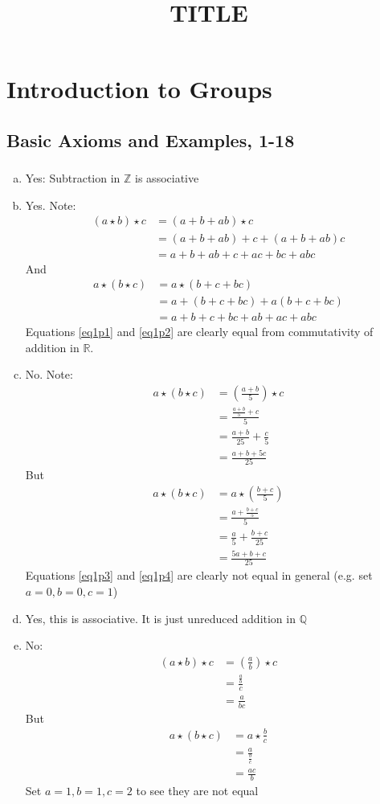 \documentclass{article}
\title{TITLE}
\newcommand{\ints}{\mathbb{Z}}
\newcommand{\reals}{\mathbb{R}}
\newcommand{\rats}{\mathbb{Q}}
\newcommand{\mult}{\star}
\begin{document}
\vspace{-5em}

\section{Introduction to Groups}
\subsection{Basic Axioms and Examples, 1-18}
\subsubsection{}
\begin{enumerate}[(a)]
\item Yes: Subtraction in $\ints$ is associative
\item Yes. Note:
\begin{align}
(a \mult b) \mult c &= (a+b+ab)\mult c\\
&= (a+b+ab) + c + (a+b+ab)c\\
&= a+b+ab+c+ac+bc+abc \label{eq1p1}
\end{align}
And
\begin{align}
a \mult (b \mult c) &= a\mult (b+c+bc)\\
&= a + (b+c+bc) + a(b+c+bc)\\
&= a+b+c+bc+ab+ac+abc \label{eq1p2}
\end{align}
Equations \eqref{eq1p1} and \eqref{eq1p2} are clearly equal from commutativity of addition in $\reals$.
\item No. Note:
\begin{align}
	a\mult(b\mult c) &= (\frac{a+b}{5})\mult c\\
&= \frac{ \frac{a+b}{5} + c}{5}\\
&= \frac{a+b}{25} + \frac{c}{5}\\
&= \frac{a+b+5c}{25} \label{eq1p3}
\end{align}
But
\begin{align}
	a\mult(b\mult c) &= a\mult (\frac{b+c}{5})\\
&= \frac{a+\frac{b+c}{5}}{5}\\
&= \frac{a}{5} + \frac{b+c}{25}\\
&= \frac{5a+b+c}{25} \label{eq1p4}
\end{align}
Equations \eqref{eq1p3} and \eqref{eq1p4} are clearly not equal in general (e.g. set $a=0,b=0,c=1$)
\item Yes, this is associative. It is just unreduced addition in $\rats$
\item No:
\begin{align*}
(a \mult b) \mult c &= (\frac{a}{b})\mult c\\
&= \frac{ \frac{a}{b} }{c}\\ 
&= \frac{a}{bc}
\end{align*}
But
\begin{align*}
a \mult (b\mult c) &= a \mult \frac{b}{c}\\
&= \frac{a}{ \frac{b}{c} } \\
&= \frac{ac}{b}
\end{align*}
Set $a=1,b=1,c=2$ to see they are not equal
\end{enumerate}
\end{document}
